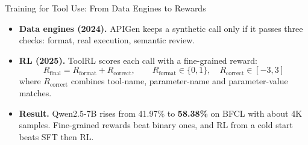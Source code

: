 \begin{frame}{Training for Tool Use: From Data Engines to Rewards}
    \begin{itemize}\itemsep0.4em
        \item \textbf{Data engines (2024).} APIGen keeps a synthetic call only if it passes three checks: format, real execution, semantic review.
        \item \textbf{RL (2025).} ToolRL scores each call with a fine-grained reward:
        \[
            R_{\text{final}} = R_{\text{format}} + R_{\text{correct}}, \qquad R_{\text{format}}\in\{0,1\}, \quad R_{\text{correct}}\in[-3,3]
        \]
        where $R_{\text{correct}}$ combines tool-name, parameter-name and parameter-value matches.
        \item \textbf{Result.} Qwen2.5-7B rises from 41.97\% to \textbf{58.38\%} on BFCL with about 4K samples. Fine-grained rewards beat binary ones, and RL from a cold start beats SFT then RL.
    \end{itemize}
\end{frame}

